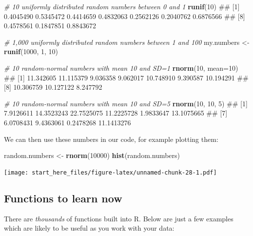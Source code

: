 \documentclass[]{article}
\newenvironment{Shaded}{\begin{snugshade}}{\end{snugshade}}
\newcommand{\KeywordTok}[1]{\textcolor[rgb]{0.13,0.29,0.53}{\textbf{#1}}}
\newcommand{\DataTypeTok}[1]{\textcolor[rgb]{0.13,0.29,0.53}{#1}}
\newcommand{\DecValTok}[1]{\textcolor[rgb]{0.00,0.00,0.81}{#1}}
\newcommand{\StringTok}[1]{\textcolor[rgb]{0.31,0.60,0.02}{#1}}
\newcommand{\CommentTok}[1]{\textcolor[rgb]{0.56,0.35,0.01}{\textit{#1}}}
\newcommand{\NormalTok}[1]{#1}
\theoremstyle{definition}
\theoremstyle{definition}
\theoremstyle{definition}
\theoremstyle{remark}
\begin{document}
\begin{Shaded}
\begin{Highlighting}[]
\CommentTok{# 10 uniformly distributed random numbers between 0 and 1}
\KeywordTok{runif}\NormalTok{(}\DecValTok{10}\NormalTok{)}
\NormalTok{##  [1] 0.4045490 0.5345472 0.4414659 0.4832063 0.2562126 0.2040762 0.6876566}
\NormalTok{##  [8] 0.4578561 0.1847851 0.8843672}

\CommentTok{# 1,000 uniformly distributed random numbers between 1 and 100}
\NormalTok{my.numbers <-}\StringTok{ }\KeywordTok{runif}\NormalTok{(}\DecValTok{1000}\NormalTok{, }\DecValTok{1}\NormalTok{, }\DecValTok{10}\NormalTok{)}

\CommentTok{# 10 random-normal numbers with mean 10 and SD=1}
\KeywordTok{rnorm}\NormalTok{(}\DecValTok{10}\NormalTok{, }\DataTypeTok{mean=}\DecValTok{10}\NormalTok{)}
\NormalTok{##  [1] 11.342605 11.115379  9.036358  9.062017 10.748910  9.390587 10.194291}
\NormalTok{##  [8] 10.306759 10.127122  8.247792}

\CommentTok{# 10 random-normal numbers with mean 10 and SD=5}
\KeywordTok{rnorm}\NormalTok{(}\DecValTok{10}\NormalTok{, }\DecValTok{10}\NormalTok{, }\DecValTok{5}\NormalTok{)}
\NormalTok{##  [1]  7.9126611 14.3523243 22.7525075 11.2225728  1.9833647 13.1075665}
\NormalTok{##  [7]  6.0708431  9.4363061  0.2478268 11.1413276}
\end{Highlighting}
\end{Shaded}

We can then use these numbers in our code, for example plotting them:

\begin{Shaded}
\begin{Highlighting}[]
\NormalTok{random.numbers <-}\StringTok{ }\KeywordTok{rnorm}\NormalTok{(}\DecValTok{10000}\NormalTok{)}
\KeywordTok{hist}\NormalTok{(random.numbers)}
\end{Highlighting}
\end{Shaded}

\texttt{[image: start\_here\_files/figure-latex/unnamed-chunk-28-1.pdf]}

\subsection*{Functions to learn now}\label{functions-to-learn-now}

There are \emph{thousands} of functions built into R. Below are just a
few examples which are likely to be useful as you work with your data:
\end{document}

